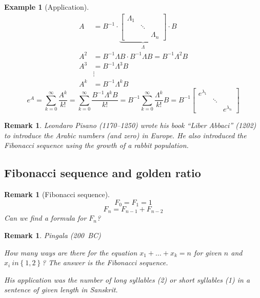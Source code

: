 \documentclass{article}
\newcounter{lecref}[section]
\numberwithin{lecref}{section}
\newtheorem{example}[lecref]{Example}
\newtheorem{remark}[lecref]{Remark}
\newcommand{\set}[1]{\left\{#1\right\}}
\begin{document}
\begin{example}[Application]
  \begin{align*}
    A &= B^{-1} \cdot \underbrace{\begin{bmatrix} \Lambda_1 & & \\ & \ddots & \\ & & \Lambda_n \end{bmatrix}}_{\Lambda} \cdot B \\
    A^2 &= B^{-1} \Lambda B \cdot B^{-1} \Lambda B = B^{-1} \Lambda^2 B \\
    A^3 &= B^{-1} \Lambda^3 B \\
        & \vdots \\
    A^k &= B^{-1} \Lambda^k B
  \end{align*}
  \[ e^A = \sum_{k=0}^\infty \frac{A^k}{k!} = \sum_{k=0}^\infty \frac{B^{-1} \Lambda^k B}{k!} = B^{-1} \sum_{k=0}^\infty \frac{\Lambda^k}{k!} B = B^{-1} \begin{bmatrix} e^{\lambda_1} & & \\ & \ddots & \\ & & e^{\lambda_n} \end{bmatrix} \]
\end{example}

\begin{remark}
  Leondaro Pisano (1170--1250) wrote his book \enquote{Liber Abbaci} (1202) to introduce the Arabic numbers (and zero) in Europe.
  He also introduced the Fibonacci sequence using the growth of a rabbit population.
\end{remark}

\subsection{Fibonacci sequence and golden ratio}

\begin{remark}[Fibonacci sequence]
  \[ F_0 = F_1 = 1 \]
  \[ F_n = F_{n-1} + F_{n-2} \]
  Can we find a formula for $F_n$?
\end{remark}

\begin{remark}
  Pingala (200~BC)

  How many ways are there for the equation $x_1 + \dots + x_k = n$ for given $n$ and $x_i \ in \set{1,2}$?
  The answer is the Fibonacci sequence.

  His application was the number of long syllables (2) or short syllables (1) in a sentence of given length in Sanskrit.
\end{remark}
\end{document}
